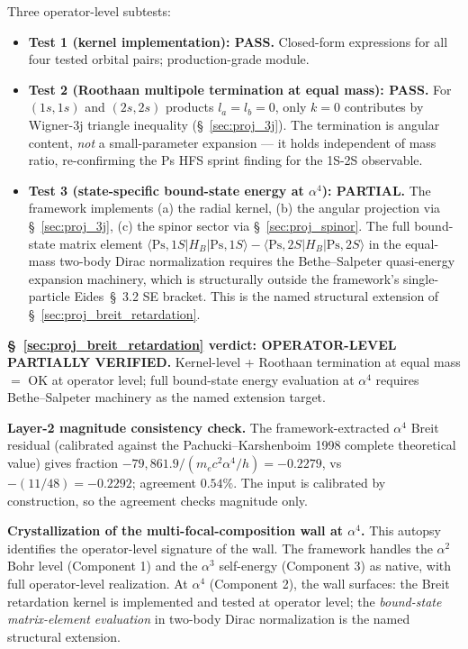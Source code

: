 \documentclass[11pt]{article}
\begin{document}
Three operator-level subtests:
\begin{itemize}\setlength\itemsep{0pt}
\item \textbf{Test 1 (kernel implementation): PASS.}  Closed-form
expressions for all four tested orbital pairs; production-grade module.
\item \textbf{Test 2 (Roothaan multipole termination at equal mass):
PASS.}  For $(1s,1s)$ and $(2s,2s)$ products $l_a = l_b = 0$, only $k=0$
contributes by Wigner-3j triangle inequality (\S~\ref{sec:proj_3j}).
The termination is angular content, \emph{not} a small-parameter
expansion --- it holds independent of mass ratio, re-confirming the
Ps HFS sprint finding for the 1S-2S observable.
\item \textbf{Test 3 (state-specific bound-state energy at $\alpha^4$):
PARTIAL.}  The framework implements (a) the radial kernel, (b) the
angular projection via \S~\ref{sec:proj_3j}, (c) the spinor sector
via \S~\ref{sec:proj_spinor}.  The full bound-state matrix element
$\langle \text{Ps}, 1S | H_B | \text{Ps}, 1S\rangle - \langle
\text{Ps}, 2S | H_B | \text{Ps}, 2S\rangle$ in the equal-mass two-body
Dirac normalization requires the Bethe--Salpeter quasi-energy expansion
machinery, which is structurally outside the framework's single-particle
Eides~\S~3.2 SE bracket.  This is the named structural extension of
\S~\ref{sec:proj_breit_retardation}.
\end{itemize}

\noindent
\textbf{\S~\ref{sec:proj_breit_retardation} verdict: OPERATOR-LEVEL
PARTIALLY VERIFIED.}  Kernel-level + Roothaan termination at equal mass
$=$ OK at operator level; full bound-state energy evaluation at $\alpha^4$
requires Bethe--Salpeter machinery as the named extension target.

\textbf{Layer-2 magnitude consistency check.}  The framework-extracted
$\alpha^4$ Breit residual (calibrated against the Pachucki--Karshenboim
1998 complete theoretical value) gives fraction
$-79{,}861.9 / (m_e c^2 \alpha^4 / h) = -0.2279$, vs $-(11/48) =
-0.2292$; agreement $0.54\%$.  The input is calibrated by
construction, so the agreement checks magnitude only.

\textbf{Crystallization of the multi-focal-composition wall at $\alpha^4$.}
This autopsy identifies the operator-level signature of the wall.  The
framework handles the $\alpha^2$ Bohr level (Component 1) and the
$\alpha^3$ self-energy (Component 3) as native, with full operator-level
realization.  At $\alpha^4$ (Component 2), the wall surfaces: the Breit
retardation kernel is implemented and tested at operator level; the
\emph{bound-state matrix-element evaluation} in two-body Dirac
normalization is the named structural extension.
\end{document}
